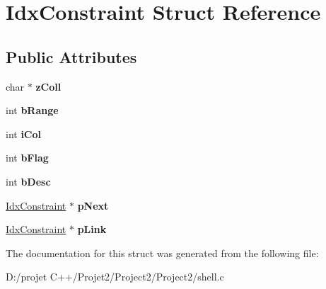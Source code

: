 \hypertarget{struct_idx_constraint}{}\section{Idx\+Constraint Struct Reference}
\label{struct_idx_constraint}
\subsection*{Public Attributes}
\begin{DoxyCompactItemize}
\item 
\mbox{\label{struct_idx_constraint_a3561a999ae668a0ca1fcf49c2f3b3510}} 
char $\ast$ {\bfseries z\+Coll}
\item 
\mbox{\label{struct_idx_constraint_a825527a1680da2cc4aaaedcc59d2e2a3}} 
int {\bfseries b\+Range}
\item 
\mbox{\label{struct_idx_constraint_a92fb8da99c983f682a54d99ce1e3218a}} 
int {\bfseries i\+Col}
\item 
\mbox{\label{struct_idx_constraint_a984b6fd9a35fcf97ccbeeb62bc814f7d}} 
int {\bfseries b\+Flag}
\item 
\mbox{\label{struct_idx_constraint_ae55a3763f01e58cc50da2288b7865595}} 
int {\bfseries b\+Desc}
\item 
\mbox{\label{struct_idx_constraint_a8e5422de0d13057988dc4c46cef0c3c7}} 
\mbox{\hyperlink{struct_idx_constraint}{Idx\+Constraint}} $\ast$ {\bfseries p\+Next}
\item 
\mbox{\label{struct_idx_constraint_a28f1b6ab37b8fa575598e0638ea9c58a}} 
\mbox{\hyperlink{struct_idx_constraint}{Idx\+Constraint}} $\ast$ {\bfseries p\+Link}
\end{DoxyCompactItemize}


The documentation for this struct was generated from the following file\+:\begin{DoxyCompactItemize}
\item 
D\+:/projet C++/\+Projet2/\+Project2/\+Project2/shell.\+c\end{DoxyCompactItemize}
